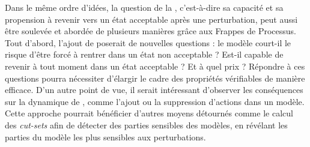 Dans le même ordre d'idées,
la question de la ,
c'est-à-dire sa capacité et sa propension à revenir vers un état acceptable après
une perturbation, peut aussi être soulevée
et abordée de plusieurs manières grâce aux Frappes de Processus.
Tout d'abord, l'ajout de  \cite{schwind13resilience}
poserait de nouvelles questions :
le modèle court-il le risque d'être forcé à rentrer dans un état non acceptable ?
Est-il capable de revenir à tout moment dans un état acceptable ?
Et à quel prix ?
Répondre à ces questions pourra nécessiter d'élargir le cadre des propriétés vérifiables
de manière efficace.
D'un autre point de vue, il serait intéressant d'observer les conséquences sur la dynamique
de , comme l'ajout ou la suppression d'actions
dans un modèle.
Cette approche pourrait bénéficier d'autres moyens détournés comme le calcul des
\textit{cut-sets} afin de détecter des parties sensibles des modèles,
en révélant les parties du modèle les plus sensibles aux perturbations.


%   
% 
